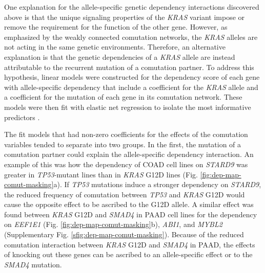 \documentclass[english, 10pt, letterpaper]{article}
\newcommand{\KRAS}{\emph{KRAS}}
\begin{document}
One explanation for the allele-specific genetic dependency interactions discovered above is that the unique signaling properties of the \KRAS{} variant impose or remove the requirement for the function of the other gene.
However, as emphasized by the weakly connected comutation networks, the \KRAS{} alleles are not acting in the same genetic environments.
Therefore, an alternative explanation is that the genetic dependencies of a \KRAS{} allele are instead attributable to the recurrent mutation of a comutation partner.
To address this hypothesis, linear models were constructed for the dependency score of each gene with allele-specific dependency that include a coefficient for the \KRAS{} allele and a coefficient for the mutation of each gene in its comutation network.
These models were then fit with elastic net regression to isolate the most informative predictors \cite{Zou2005RegularizationNet}.

The fit models that had non-zero coefficients for the effects of the comutation variables tended to separate into two groups.
In the first, the mutation of a comutation partner could explain the allele-specific dependency interaction.
An example of this was how the dependency of COAD cell lines on \emph{STARD9} was greater in \emph{TP53}-mutant lines than in \KRAS{} G12D lines (Fig. \ref{fig:dep-map-comut-masking}a).
If \emph{TP53} mutations induce a stronger dependency on \emph{STARD9}, the reduced frequency of comutation between \emph{TP53} and \KRAS{} G12D would cause the opposite effect to be ascribed to the G12D allele.
A similar effect was found between \KRAS{} G12D and \emph{SMAD4} in PAAD cell lines for the dependency on \emph{EEF1E1} (Fig. \ref{fig:dep-map-comut-masking}b), \emph{ABI1}, and \emph{MYBL2} (Supplementary Fig. \ref{sfig:dep-map-comut-masking}).
Because of the reduced comutation interaction between \KRAS{} G12D and \emph{SMAD4} in PAAD, the effects of knocking out these genes can be ascribed to an allele-specific effect or to the \emph{SMAD4} mutation.
\end{document}
